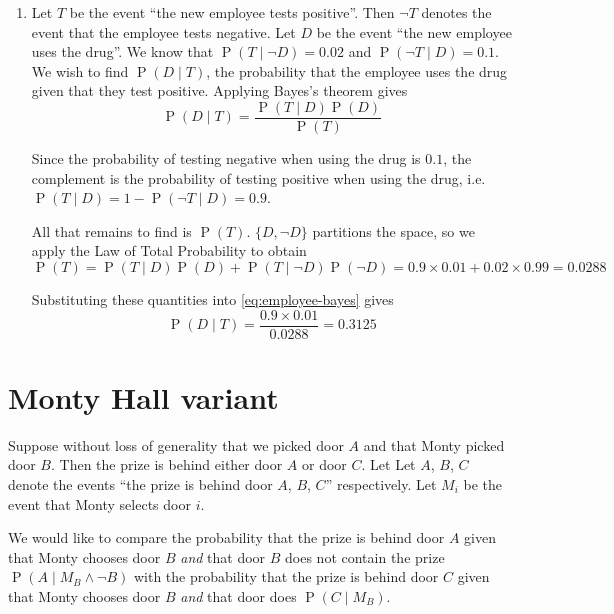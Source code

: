 \documentclass[letterpaper,11pt]{article}
\DeclareMathOperator{\Prob}{P}
\renewcommand{\P}[1]{\Prob{\parens{#1}}}
\newcommand{\parens}[1]{\left(#1\right)}
\newcommand{\given}{\;\vert\;}
\newcommand{\question}{\section}
\begin{document}
\begin{enumerate}
    \item
        Let $T$ be the event ``the new employee tests positive''. Then $\neg T$
        denotes the event that the employee tests negative.
        Let $D$ be the event ``the new employee uses the drug''.
        We know that $\P{T \given \neg D} = 0.02$
        and $\P{\neg T \given D} = 0.1$.
        We wish to find $\P{D \given T}$, the probability that the employee
        uses the drug given that they test positive.
        Applying Bayes's theorem gives
        \begin{equation*}
            \label{eq:employee-bayes}
            \P{D \given T} = \frac{
                \P{T \given D} \P{D}
            }{
                \P{T}
            }
        \end{equation*}

        Since the probability of testing negative when using the drug is $0.1$,
        the complement is the probability of testing positive when using the
        drug, i.e. $\P{T \given D} = 1 - \P{\neg T \given D} = 0.9$.

        All that remains to find is $\P{T}$. $\{D, \neg D\}$ partitions the
        space, so we apply the Law of Total Probability to obtain
        \begin{equation*}
            \P{T} = \P{T \given D} \P{D} + \P{T \given \neg D} \P{\neg D}
            = 0.9 \times 0.01 + 0.02 \times 0.99
            = 0.0288
        \end{equation*}

        Substituting these quantities into \eqref{eq:employee-bayes} gives
        \begin{equation*}
            \P{D \given T} = \frac{
                0.9 \times 0.01
            }{
                0.0288
            }
            = 0.3125
        \end{equation*}
\end{enumerate}

\question{Monty Hall variant}

Suppose without loss of generality that we picked door $A$ and that Monty
picked door $B$. Then the prize is behind either door $A$ or door $C$. Let
Let $A$, $B$, $C$ denote the events ``the prize is behind door $A$, $B$, $C$''
respectively. Let $M_i$ be the event that Monty selects door $i$.

We would like to compare the probability that the prize is behind door $A$
given that Monty chooses door $B$ \emph{and} that door $B$ does not contain the
prize $\P{A \given M_B \land \neg B}$
with the probability that the prize is behind door $C$ given that Monty chooses
door $B$ \emph{and} that door does  $\P{C \given M_B}$.
\end{document}
